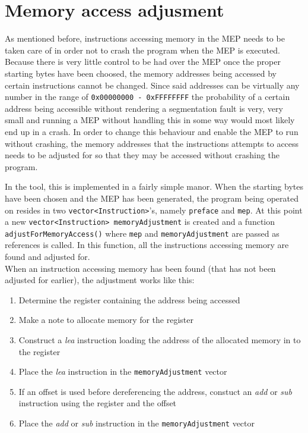 \documentclass[11pt,twoside]{eitExjobb}
\begin{document}
\section{Memory access adjusment}
As mentioned before, instructions accessing memory in the MEP needs to be taken care of in order not to crash the program when the MEP is executed. Because there is very little control to be had over the MEP once the proper starting bytes have been choosed, the memory addresses being accessed by certain instructions cannot be changed. Since said addresses can be virtually any number in the range of \texttt{0x00000000 - 0xFFFFFFFF} the probability of a certain address being accessible without rendering a segmentation fault is very, very small and running a MEP without handling this in some way would most likely end up in a crash.  In order to change this behaviour and enable the MEP to run without crashing, the memory addresses that the instructions attempts to access needs to be adjusted for so that they may be accessed without crashing the program. 

In the tool, this is implemented in a fairly simple manor. When the starting bytes have been chosen and the MEP has been generated, the program being operated on resides in two \texttt{vector<Instruction>}'s, namely \texttt{preface} and \texttt{mep}. At this point a new \texttt{vector<Instruction> memoryAdjustment} is created and a function \texttt{adjustForMemoryAccess()} where \texttt{mep} and \texttt{memoryAdjustment} are passed as references is called. In this function, all the instructions accessing memory are found and adjusted for.\\

\noindent When an instruction accessing memory has been found (that has not been adjusted for earlier), the adjustment works like this:
\begin{enumerate}
\item{Determine the register containing the address being accessed}
\item{Make a note to allocate memory for the register}
\item{Construct a \emph{lea} instruction loading the address of the allocated memory in to the register}
\item{Place the \emph{lea} instruction in the \texttt{memoryAdjustment} vector}
\item{If an offset is used before dereferencing the address, constuct an \emph{add} or \emph{sub} instruction using the register and the offset}
\item{Place the \emph{add} or \emph{sub} instruction in the \texttt{memoryAdjustment} vector}
\end{enumerate} 
\end{document}
